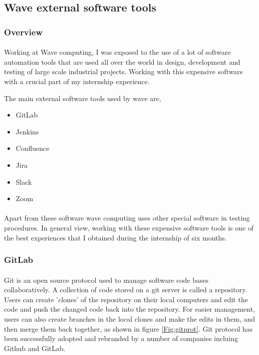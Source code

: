 
\newpage
\subsection{Wave external software tools}
\subsubsection{Overview}
\paragraph{}
Working at Wave computing, I was exposed to the use of a lot of software automation tools that are used all over the world in design, development and testing of large scale industrial projects. Working with this expensive software with a crucial part of my internship experience.

The main external software tools used by wave are,
\begin{itemize}
    \item GitLab
    \item Jenkins
    \item Confluence
    \item Jira
    \item Slack
    \item Zoom
\end{itemize}

\paragraph{}
Apart from these software wave computing uses other special software in testing procedures. In general view, working with these expensive software tools is one of the best experiences that I obtained during the internship of six months.

\subsubsection{GitLab}
\paragraph{}
Git is an open source protocol used to manage software code bases collaboratively. A collection of code stored on a git server is called a repository. Users can create 'clones' of the repository on their local computers and edit the code and push the changed code back into the repository. For easier management, users can also create branches in the local clones and make the edits in them, and then merge them back together, as shown in figure \ref{Fig:gitprot}. Git protocol has been successfully adopted and rebranded by a number of companies incluing Github and GitLab.

